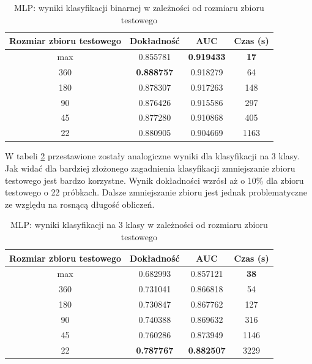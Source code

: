 \documentclass[a4paper, twoside, 11pt, openright]{article}
\begin{document}
\begin{table}[H]
    \centering
    \begin{tabular}{|c|c|c|c|}
    \hline
        \textbf{Rozmiar zbioru testowego} & \textbf{Dokładność} &  \textbf{AUC} &  \textbf{Czas (s)} \\ \hline 
max                           &  0.855781 &  \textbf{0.919433} &   \textbf{17} \\  \hline
360                         &  \textbf{0.888757} &  0.918279 &   64 \\  \hline
180                         &  0.878307 &  0.917263 &  148 \\  \hline
90                          &  0.876426 &  0.915586 &  297 \\ \hline
45                          &  0.877280 &  0.910868 &   405 \\ \hline
22                          &  0.880905 &  0.904669 &  1163 \\ \hline
    \end{tabular}
    \caption{MLP: wyniki klasyfikacji binarnej w zależności od rozmiaru zbioru testowego}
    \label{tab:nn_walk_forward_test_binary}
\end{table}

W tabeli \ref{tab:nn_walk_forward_test_discrete} przestawione zostały analogiczne wyniki dla klasyfikacji na 3 klasy. Jak widać dla bardziej złożonego zagadnienia klasyfikacji zmniejszanie zbioru testowego jest bardzo korzystne. Wynik dokładności wzrósł aż o 10\% dla zbioru testowego o 22 próbkach. Dalsze zmniejszanie zbioru jest jednak problematyczne ze względu na rosnącą długość obliczeń.

\begin{table}[H]
    \centering
    \begin{tabular}{|c|c|c|c|}
    \hline
        \textbf{Rozmiar zbioru testowego} & \textbf{Dokładność} &  \textbf{AUC} &  \textbf{Czas (s)} \\ \hline
max    &  0.682993 &  0.857121 &  \textbf{38} \\ \hline
360     &  0.731041 &  0.866818 &  54 \\ \hline
180   &  0.730847 &  0.867762 &  127 \\ \hline
90   &  0.740388 &  0.869632 &  316 \\ \hline
45     &  0.760286 &  0.873949 &  1146 \\ \hline
22  &  \textbf{0.787767} &  \textbf{0.882507} &  3229 \\ \hline
    \end{tabular}
    \caption{MLP: wyniki klasyfikacji na 3 klasy w zależności od rozmiaru zbioru testowego}
    \label{tab:nn_walk_forward_test_discrete}
\end{table}
\end{document}
